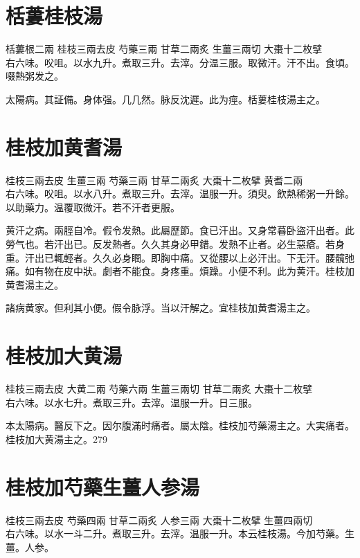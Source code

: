 \section{栝蔞桂枝湯}

栝蔞根{\scriptsize 二兩} 桂枝{\scriptsize 三兩去皮} 芍藥{\scriptsize 三兩} 甘草{\scriptsize 二兩炙} 生薑{\scriptsize 三兩切} 大棗{\scriptsize 十二枚擘}\\
右六味。㕮咀。以水九升。煮取三升。去滓。分温三服。取微汗。汗不出。食頃。啜熱粥发之。

太陽病。其証備。身体强。几几然。脉反沈遲。此为痙。栝蔞桂枝湯主之。

\section{桂枝加黄耆湯}

桂枝{\scriptsize 三兩去皮} 生薑{\scriptsize 三兩} 芍藥{\scriptsize 三兩} 甘草{\scriptsize 二兩炙} 大棗{\scriptsize 十二枚擘} 黄耆{\scriptsize 二兩}\\
右六味。㕮咀。以水八升。煮取三升。去滓。温服一升。須臾。飲熱稀粥一升餘。以助藥力。温覆取微汗。若不汗者更服。

黄汗之病。兩脛自冷。假令发熱。此屬歷節。食已汗出。又身常暮{\khaaitp 卧}盜汗出者。此勞气也。若汗出已。反发熱者。久久其身必甲錯。发熱不止者。必生惡瘡。若身重。汗出已輒輕者。久久必身瞤。即胸中痛。又從腰以上必汗出。下无汗。腰髖弛痛。如有物在皮中狀。劇者不能食。身疼重。煩躁。小便不利。此为黄汗。桂枝加黄耆湯主之。

諸病黄家。但利其小便。假令脉浮。当以汗解之。宜桂枝加黄耆湯主之。

\section{桂枝加大黄湯}

桂枝{\scriptsize 三兩去皮} 大黄{\scriptsize 二兩} 芍藥{\scriptsize 六兩} 生薑{\scriptsize 三兩切} 甘草{\scriptsize 二兩炙} 大棗{\scriptsize 十二枚擘}\\
右六味。以水七升。煮取三升。去滓。温服一升。日三服。

{\khaaitp 本}太陽病。醫反下之。因尔腹滿时痛者。屬太陰。桂枝加芍藥湯主之。大実痛者。桂枝加大黄湯主之。279

\section{桂枝加芍藥生薑人参湯}

桂枝{\scriptsize 三兩去皮} 芍藥{\scriptsize 四兩} 甘草{\scriptsize 二兩炙} 人参{\scriptsize 三兩} 大棗{\scriptsize 十二枚擘} 生薑{\scriptsize 四兩切}\\
右六味。以水一斗二升。煮取三升。去滓。温服一升。本云桂枝湯。今加芍藥。生薑。人参。

